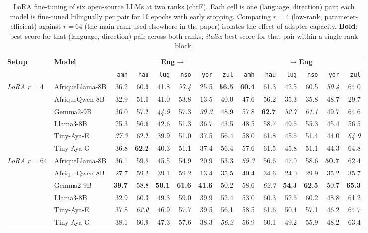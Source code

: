 \begin{table}[t]
\centering
\small
\renewcommand{\arraystretch}{1.05}
\begin{tabular}{llrrrrrrrrrrrr}
\toprule
\textbf{Setup} & \textbf{Model} & \multicolumn{6}{c}{\textbf{Eng$\to$}} & \multicolumn{6}{c}{\textbf{$\to$Eng}} \\
\cmidrule(lr){3-8}\cmidrule(lr){9-14}
  &   & \texttt{amh} & \texttt{hau} & \texttt{lug} & \texttt{nso} & \texttt{yor} & \texttt{zul} & \texttt{amh} & \texttt{hau} & \texttt{lug} & \texttt{nso} & \texttt{yor} & \texttt{zul} \\
\midrule
\multirow{6}{*}{\textit{LoRA $r{=}4$}} & AfriqueLlama-8B & 36.2 & 60.9 & 41.8 & \emph{57.4} & 25.5 & \textbf{56.5} & \textbf{60.4} & 61.3 & 42.5 & 60.5 & \emph{50.4} & 64.0 \\
 & AfriqueQwen-8B & 32.9 & 51.0 & 41.0 & 53.8 & 13.5 & 40.0 & 47.6 & 56.2 & 35.3 & 35.8 & 48.7 & 29.7 \\
 & Gemma2-9B & 36.0 & 57.2 & \emph{44.9} & 57.3 & \emph{39.3} & 48.9 & 57.8 & \textbf{62.7} & \emph{52.7} & \emph{61.1} & 49.7 & 64.6 \\
 & Llama3-8B & 25.3 & 56.6 & 42.6 & 51.3 & 36.7 & 43.5 & 48.5 & 58.7 & 49.6 & 55.3 & 45.4 & 56.5 \\
 & Tiny-Aya-E & \emph{37.3} & 62.2 & 39.9 & 51.0 & 37.5 & 56.4 & 58.0 & 61.8 & 45.6 & 51.4 & 44.0 & \emph{64.9} \\
 & Tiny-Aya-G & 36.8 & \textbf{62.2} & 40.3 & 51.1 & 37.4 & 56.4 & 57.6 & 61.5 & 45.8 & 51.1 & 44.3 & 64.8 \\
\midrule
\multirow{6}{*}{\textit{LoRA $r{=}64$}} & AfriqueLlama-8B & 36.1 & 59.8 & 45.5 & 54.9 & 20.9 & 53.3 & \emph{59.3} & 56.6 & 47.0 & 58.6 & \textbf{50.7} & 62.4 \\
 & AfriqueQwen-8B & 27.7 & 59.2 & 39.1 & 59.2 & 13.4 & 35.5 & 40.4 & 34.6 & 24.0 & 29.9 & 35.2 & 35.7 \\
 & Gemma2-9B & \textbf{39.7} & 58.8 & \textbf{50.1} & \textbf{61.6} & \textbf{41.6} & 50.2 & 58.6 & \emph{62.7} & \textbf{54.3} & \textbf{62.5} & 50.7 & \textbf{65.3} \\
 & Llama3-8B & 32.9 & 60.3 & 49.3 & 59.0 & 39.9 & 52.4 & 53.0 & 60.3 & 52.6 & 60.2 & 48.8 & 61.2 \\
 & Tiny-Aya-E & 37.8 & \emph{62.0} & 46.9 & 57.7 & 39.5 & 56.1 & 58.5 & 61.6 & 50.4 & 57.1 & 46.2 & 64.7 \\
 & Tiny-Aya-G & 38.1 & 60.9 & 47.3 & 57.6 & 38.3 & \emph{56.2} & 56.9 & 60.1 & 49.2 & 55.9 & 48.2 & 63.4 \\
\bottomrule
\end{tabular}
\caption{LoRA fine-tuning of six open-source LLMs at two ranks (chrF). Each cell is one (language, direction) pair; each model is fine-tuned bilingually per pair for 10 epochs with early stopping. Comparing $r{=}4$ (low-rank, parameter-efficient) against $r{=}64$ (the main rank used elsewhere in the paper) isolates the effect of adapter capacity. \textbf{Bold}: best score for that (language, direction) pair across both ranks; \emph{italic}: best score for that pair within a single rank block.}
\label{tab:lora_chrf}
\end{table}
